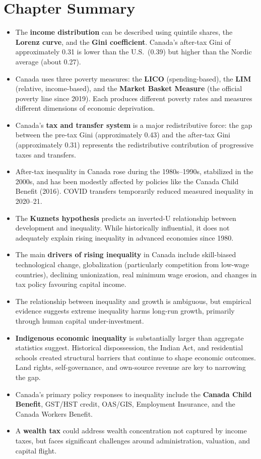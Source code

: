 \section*{Chapter Summary}

\begin{itemize}
  \item The \textbf{income distribution} can be described using quintile shares, the \textbf{Lorenz curve}, and the \textbf{Gini coefficient}. Canada's after-tax Gini of approximately 0.31 is lower than the U.S.\ (0.39) but higher than the Nordic average (about 0.27).
  \item Canada uses three poverty measures: the \textbf{LICO} (spending-based), the \textbf{LIM} (relative, income-based), and the \textbf{Market Basket Measure} (the official poverty line since 2019). Each produces different poverty rates and measures different dimensions of economic deprivation.
  \item Canada's \textbf{tax and transfer system} is a major redistributive force: the gap between the pre-tax Gini (approximately 0.43) and the after-tax Gini (approximately 0.31) represents the redistributive contribution of progressive taxes and transfers.
  \item After-tax inequality in Canada rose during the 1980s--1990s, stabilized in the 2000s, and has been modestly affected by policies like the Canada Child Benefit (2016). COVID transfers temporarily reduced measured inequality in 2020--21.
  \item The \textbf{Kuznets hypothesis} predicts an inverted-U relationship between development and inequality. While historically influential, it does not adequately explain rising inequality in advanced economies since 1980.
  \item The main \textbf{drivers of rising inequality} in Canada include skill-biased technological change, globalization (particularly competition from low-wage countries), declining unionization, real minimum wage erosion, and changes in tax policy favouring capital income.
  \item The relationship between inequality and growth is ambiguous, but empirical evidence suggests extreme inequality harms long-run growth, primarily through human capital under-investment.
  \item \textbf{Indigenous economic inequality} is substantially larger than aggregate statistics suggest. Historical dispossession, the Indian Act, and residential schools created structural barriers that continue to shape economic outcomes. Land rights, self-governance, and own-source revenue are key to narrowing the gap.
  \item Canada's primary policy responses to inequality include the \textbf{Canada Child Benefit}, GST/HST credit, OAS/GIS, Employment Insurance, and the Canada Workers Benefit.
  \item A \textbf{wealth tax} could address wealth concentration not captured by income taxes, but faces significant challenges around administration, valuation, and capital flight.
\end{itemize}

